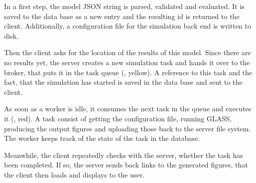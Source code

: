 
In a first step, the model JSON string is parsed, validated and evaluated.
It is saved to the data base as a new entry and the resulting id is returned to the client.
Additionally, a configuration file for the simulation back end is written to disk. 

Then the client asks for the location of the results of this model.
Since there are no results yet, the server creates a new simulation task and hands it over to the broker, that puts it in the task queue (, yellow).
A reference to this task and the fact, that the simulation has started is saved in the data base and sent to the client.

As soon as a worker is idle, it consumes the next task in the queue and executes it (, red).
A task consist of getting the configuration file, running GLASS, producing the output figures and uploading those back to the server file system.
The worker keeps track of the state of the task in the database.

Meanwhile, the client repeatedly checks with the server, whether the task has been completed.
If so, the server sends back links to the generated figures, that the client then loads and displays to the user.







